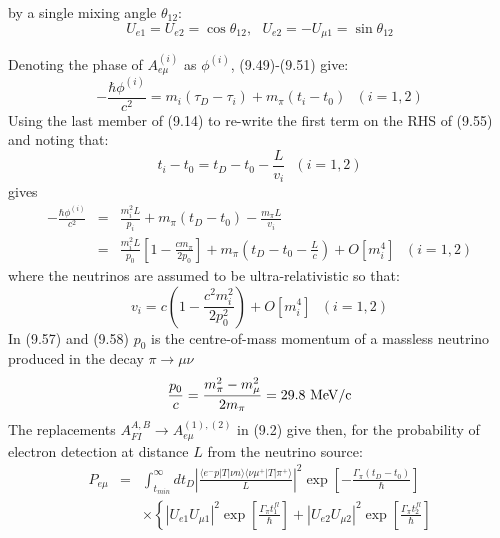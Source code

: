 {  by a single mixing angle $\theta_{12}$:
    \begin{equation}
   U_{e1} = U_{e2} = \cos \theta_{12},~~~ U_{e2} = -U_{\mu 1} = \sin  \theta_{12}
    \end{equation}
  \par Denoting the phase of  $A_{e\mu}^{(i)}$ as $\phi^{(i)}$, (9.49)-(9.51) give:
    \begin{equation}
   -\frac{\hbar \phi^{(i)}}{c^2} =  m_i (\tau_D-\tau_i)+ m_{\pi}(t_i-t_0)~~~(i=1, 2) 
   \end{equation}                         
   Using the last member of (9.14) to re-write the first term on the RHS of (9.55) and noting that:
    \begin{equation}  
    t_i - t_0 = t_D-t_0-\frac{L}{v_i}~~~(i=1, 2)
    \end{equation}
    gives
     \begin{eqnarray}
   -\frac{\hbar \phi^{(i)}}{c^2} & = & \frac{m_i^2 L}{p_i}+ m_{\pi}(t_D-t_0) -\frac{ m_{\pi} L}{v_i}
      \nonumber \\
       & = & \frac{m_i^2 L}{p_0}\left[1-\frac{c m_{\pi}}{2 p_0}\right]+ m_{\pi}(t_D-t_0-\frac{L}{c})
     + O[m_i^4]~~~(i=1, 2) 
   \end{eqnarray}
     where the neutrinos are assumed to be ultra-relativistic so that:
       \begin{equation} 
    v_i = c\left(1-\frac{c^2 m_i^2}{2 p_0^2} \right) + O[m_i^4]~~~(i=1, 2)
    \end{equation}
   In (9.57) and (9.58) $p_0$ is the centre-of-mass momentum of a massless neutrino produced
   in the decay $ \pi \rightarrow \mu \nu$
    \begin{equation}
    \frac{p_0}{c} = \frac{m_{\pi}^2-m_{\mu}^2}{2 m_{\pi}} = 29.8~{\rm MeV/c}
    \end{equation} 
    The replacements $A_{FI}^{A,B} \rightarrow A_{e \mu}^{(1),(2)}$ in (9.2) give then,
    for the probability
   of electron detection at distance $L$ from the neutrino source:
      \begin{eqnarray}
       P_{e \mu} & = & \int_{t_{min}}^{\infty}d t_D \left|\frac{\langle e^-  p |T|\nu n \rangle
        \langle \nu \mu^+ |T|\pi^+ \rangle}{L}\right|^2\exp\left[-\frac{\Gamma_{\pi}(t_D-t_0)}{\hbar}\right]
      \nonumber \\
   &   &  \times \left\{ |U_{e 1} U_{\mu 1}|^2 \exp\left[\frac{\Gamma_{\pi} t_1^{fl}}{\hbar} \right]  
     +  |U_{e 2} U_{\mu 2}|^2 \exp\left[\frac{\Gamma_{\pi} t_2^{fl}}{\hbar}\right] \right. \nonumber \\

\end{eqnarray}}

